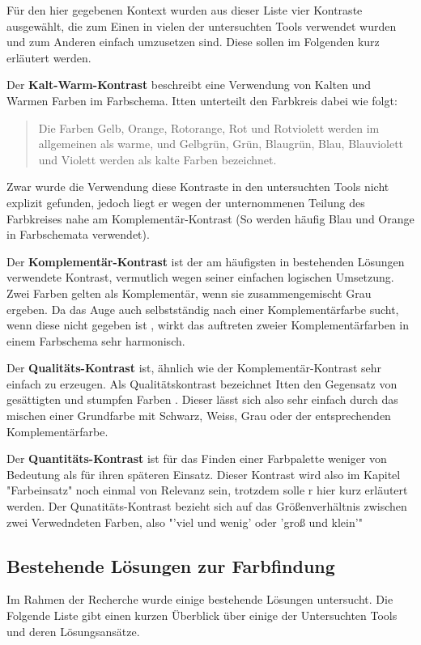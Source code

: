 Für den hier gegebenen Kontext wurden aus dieser Liste vier Kontraste ausgewählt, die zum Einen in vielen der untersuchten Tools verwendet wurden und zum Anderen einfach umzusetzen sind. Diese sollen im Folgenden kurz erläutert werden.

Der \textbf{Kalt-Warm-Kontrast} beschreibt eine Verwendung von Kalten und Warmen Farben im Farbschema. Itten unterteilt den Farbkreis dabei wie folgt:

\begin{quote}
Die Farben Gelb, Orange, Rotorange, Rot und Rotviolett werden im allgemeinen als warme, und Gelbgrün, Grün, Blaugrün, Blau, Blauviolett und Violett werden als kalte Farben bezeichnet.
\cite[S. 45]{Itten201006}
\end{quote}

Zwar wurde die Verwendung diese Kontraste in den untersuchten Tools nicht explizit gefunden, jedoch liegt er wegen der unternommenen Teilung des Farbkreises nahe am Komplementär-Kontrast (So werden häufig Blau und Orange in Farbschemata verwendet).

Der \textbf{Komplementär-Kontrast} ist der am häufigsten in bestehenden Lösungen verwendete Kontrast, vermutlich wegen seiner einfachen logischen Umsetzung. Zwei Farben gelten als Komplementär, wenn sie zusammengemischt Grau ergeben.
Da das Auge auch selbstständig nach einer Komplementärfarbe sucht, wenn diese nicht gegeben ist \cite[S. 49]{Itten201006}, wirkt das auftreten zweier Komplementärfarben in einem Farbschema sehr harmonisch.

Der \textbf{Qualitäts-Kontrast} ist, ähnlich wie der Komplementär-Kontrast sehr einfach zu erzeugen. Als Qualitätskontrast bezeichnet Itten den Gegensatz von gesättigten und stumpfen Farben \cite[S. 55]{Itten201006}. Dieser lässt sich also sehr einfach durch das mischen einer Grundfarbe mit Schwarz, Weiss, Grau oder der entsprechenden Komplementärfarbe.

Der \textbf{Quantitäts-Kontrast} ist für das Finden einer Farbpalette weniger von Bedeutung als für ihren späteren Einsatz. Dieser Kontrast wird also im Kapitel "Farbeinsatz" noch einmal von Relevanz sein, trotzdem solle r hier kurz erläutert werden. Der Qunatitäts-Kontrast bezieht sich auf das Größenverhältnis zwischen zwei Verwedndeten Farben, also "'viel und wenig' oder 'groß und klein'" \cite[S. 59]{Itten201006}


\subsection{Bestehende Lösungen zur Farbfindung}
Im Rahmen der Recherche wurde einige bestehende Lösungen untersucht. Die Folgende Liste gibt einen kurzen Überblick über einige der Untersuchten Tools und deren Lösungsansätze.


